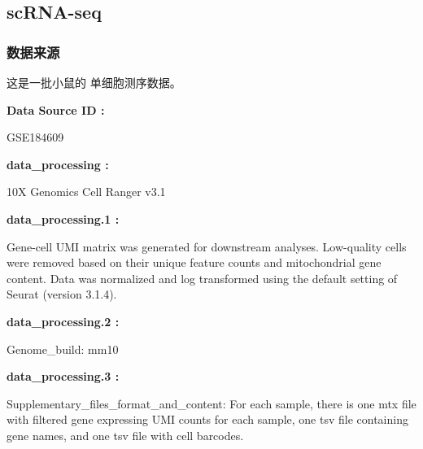 \documentclass[
]{article}
\begin{document}
\hypertarget{scrna-seq}{%
\subsection{scRNA-seq}\label{scrna-seq}}

\hypertarget{ux6570ux636eux6765ux6e90}{%
\subsubsection{数据来源}\label{ux6570ux636eux6765ux6e90}}

这是一批小鼠的 单细胞测序数据。

\begin{center}\begin{tcolorbox}[colback=gray!10, colframe=gray!50, width=0.9\linewidth, arc=1mm, boxrule=0.5pt]
\textbf{
Data Source ID
:}

\vspace{0.5em}

    GSE184609

\vspace{2em}


\textbf{
data\_processing
:}

\vspace{0.5em}

    10X Genomics Cell Ranger v3.1

\vspace{2em}


\textbf{
data\_processing.1
:}

\vspace{0.5em}

    Gene-cell UMI matrix was generated for downstream
analyses. Low-quality cells were removed based on their
unique feature counts and mitochondrial gene content. Data
was normalized and log transformed using the default
setting of Seurat (version 3.1.4).

\vspace{2em}


\textbf{
data\_processing.2
:}

\vspace{0.5em}

    Genome\_build: mm10

\vspace{2em}


\textbf{
data\_processing.3
:}

\vspace{0.5em}

    Supplementary\_files\_format\_and\_content: For each
sample, there is one mtx file with filtered gene expressing
UMI counts for each sample, one tsv file containing gene
names, and one tsv file with cell barcodes.

\vspace{2em}
\end{tcolorbox}
\end{center}
\end{document}
